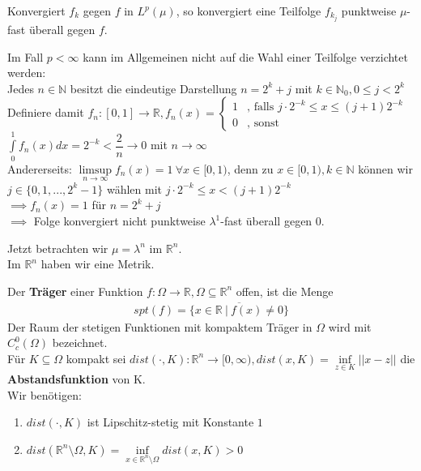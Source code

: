   \begin{lemma}
    Konvergiert $f_k$ gegen $f$ in $L^p(\mu)$, so konvergiert eine Teilfolge $f_{k_j}$ punktweise $\mu$-fast überall gegen $f$.
  \end{lemma}  
  
  \begin{example}
    Im Fall $p < \infty$ kann im Allgemeinen nicht auf die Wahl einer Teilfolge verzichtet werden:\\
    Jedes $n \in \mathbb{N}$ besitzt die eindeutige Darstellung $n=2^k+j$ mit $k \in \mathbb{N}_0, 0 \leq j < 2^k$\\
    Definiere damit $f_n:[0,1] \to \mathbb{R}, f_n(x) = \begin{cases}
      1 & \text{, falls } j \cdot 2^{-k} \leq x \leq (j+1) 2^{-k}\\
      0 & \text{, sonst}
    \end{cases}$\\
    $\int\limits_0^1 f_n(x) dx = 2^{-k} < \dfrac{2}{n} \to 0$ mit $n \to \infty$\\
    Andererseits: $\limsup\limits_{n \to \infty} f_n(x) = 1 \ \forall x \in [0,1)$, denn zu $x \in [0,1), k \in \mathbb{N}$ können wir\\
    $j \in \{0,1,...,2^k-1\}$ wählen mit $j \cdot 2^{-k} \leq x < (j+1) 2^{-k}$\\
    $\implies f_n(x) = 1$ für $n = 2^k+j$\\
    $\implies$ Folge konvergiert nicht punktweise $\lambda^1$-fast überall gegen $0$.
  \end{example}

  \begin{remark}
    Jetzt betrachten wir $\mu=\lambda^n$ im $\mathbb{R}^n$.\\
    Im $\mathbb{R}^n$ haben wir eine Metrik.
  \end{remark}

  \begin{definition}
    Der \textbf{Träger} einer Funktion $f:\Omega \to \mathbb{R}, \Omega \subseteq \mathbb{R}^n$ offen, ist die Menge 
    \begin{align*}
      spt(f) = \overline{\{x \in \mathbb{R} \ | \ f(x) \neq 0\}}
    \end{align*}
    Der Raum der stetigen Funktionen mit kompaktem Träger in $\Omega$ wird mit $C_c^0(\Omega)$ bezeichnet.\\
    Für $K \subseteq \Omega$ kompakt sei $dist(\cdot, K): \mathbb{R}^n \to [0, \infty), dist(x, K) = \inf\limits_{z \in K} ||x - z||$ die \textbf{Abstandsfunktion} von K.\\
    Wir benötigen:
    \begin{enumerate}
      \item $dist(\cdot, K)$ ist Lipschitz-stetig mit Konstante $1$
      \item $dist(\mathbb{R}^n \setminus \Omega, K) = \inf\limits_{x \in \mathbb{R}^n \setminus \Omega} dist(x, K) > 0$
    \end{enumerate}
  \end{definition}

